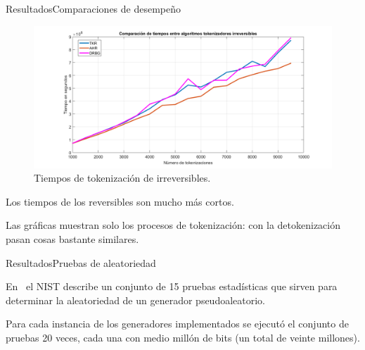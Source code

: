 \begin{frame}{Resultados}{Comparaciones de desempeño}
  {
    \begin{figure}[H]
      \begin{center}
        \includegraphics[width=1.0\linewidth]
          {../../../diagramas_comunes/desempenio/tok_irrev.png}
        \caption{Tiempos de tokenización de irreversibles.}
      \end{center}
    \end{figure}
  }

  \note
  {
    Los tiempos de los reversibles son mucho más cortos.

    Las gráficas muestran solo los procesos de tokenización: con la
    detokenización pasan cosas bastante similares.
  }

\end{frame}

\begin{frame}{Resultados}{Pruebas de aleatoriedad}

  En~\cite{nist_pruebas} el NIST describe un conjunto de 15 pruebas
  estadísticas que sirven para determinar la aleatoriedad de un generador
  pseudoaleatorio.

  Para cada instancia de los generadores implementados se ejecutó el conjunto
  de pruebas 20 veces, cada una con medio millón de bits (un total de veinte
  millones).

\end{frame}

